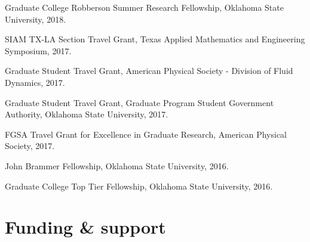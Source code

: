 \documentclass[letterpaper]{article}
\renewenvironment{itemize}{
  \begin{list}{}{
    \setlength{\leftmargin}{1.5em}
  }
}{
  \end{list}
}
\begin{document}
\begin{itemize}
\item Graduate College Robberson Summer Research Fellowship, Oklahoma State University, 2018.

\item SIAM TX-LA Section Travel Grant, Texas Applied Mathematics and Engineering Symposium, 2017.

\item Graduate Student Travel Grant, American Physical Society - Division of Fluid Dynamics, 2017.

\item Graduate Student Travel Grant, Graduate Program Student Government Authority, Oklahoma State University, 2017.

\item FGSA Travel Grant for Excellence in Graduate Research, American Physical Society, 2017.

\item John Brammer Fellowship, Oklahoma State University, 2016.

\item Graduate College Top Tier Fellowship, Oklahoma State University, 2016.

\end{itemize}

\section*{Funding \& support}
\end{document}
